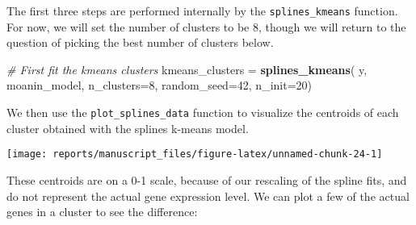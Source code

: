 \documentclass[9pt,a4paper,]{extarticle}
\newenvironment{Shaded}{\begin{snugshade}}{\end{snugshade}}
\newcommand{\CommentTok}[1]{\textcolor[rgb]{0.56,0.35,0.01}{\textit{#1}}}
\newcommand{\DataTypeTok}[1]{\textcolor[rgb]{0.13,0.29,0.53}{#1}}
\newcommand{\DecValTok}[1]{\textcolor[rgb]{0.00,0.00,0.81}{#1}}
\newcommand{\FloatTok}[1]{\textcolor[rgb]{0.00,0.00,0.81}{#1}}
\newcommand{\KeywordTok}[1]{\textcolor[rgb]{0.13,0.29,0.53}{\textbf{#1}}}
\newcommand{\NormalTok}[1]{#1}
\newcommand{\OperatorTok}[1]{\textcolor[rgb]{0.81,0.36,0.00}{\textbf{#1}}}
\newcommand{\OtherTok}[1]{\textcolor[rgb]{0.56,0.35,0.01}{#1}}
\newcommand{\StringTok}[1]{\textcolor[rgb]{0.31,0.60,0.02}{#1}}
\begin{document}
The first three steps are performed internally by the \texttt{splines\_kmeans}
function. For now, we will set the number of clusters to be \(8\), though we
will return to the question of picking the best number of clusters below.

\begin{Shaded}
\begin{Highlighting}[]
\CommentTok{# First fit the kmeans clusters}
\NormalTok{kmeans_clusters =}\StringTok{ }\KeywordTok{splines_kmeans}\NormalTok{(}
\NormalTok{    y, moanin_model, }\DataTypeTok{n_clusters=}\DecValTok{8}\NormalTok{,}
    \DataTypeTok{random_seed=}\DecValTok{42}\NormalTok{,}
    \DataTypeTok{n_init=}\DecValTok{20}\NormalTok{)}
\end{Highlighting}
\end{Shaded}

We then use the \texttt{plot\_splines\_data} function to visualize the centroids of
each cluster obtained with the splines k-means model.

\begin{Shaded}
\end{Shaded}

\begin{center}\texttt{[image: reports/manuscript\_files/figure-latex/unnamed-chunk-24-1]} \end{center}

These centroids are on a 0-1 scale, because of our rescaling of the spline
fits, and do not represent the actual gene expression level. We can plot a few
of the actual genes in a cluster to see the difference:

\begin{Shaded}
\end{Shaded}
\end{document}
